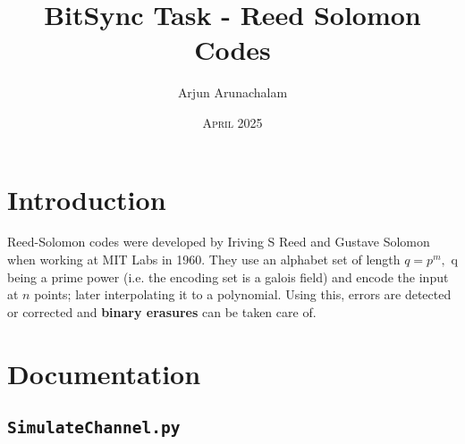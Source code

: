\documentclass{scrartcl}
\title{BitSync Task - Reed Solomon Codes}
\author{Arjun Arunachalam}
\date{\textsc{April 2025}}
\begin{document}
\maketitle

\section{Introduction}
Reed-Solomon codes were developed by Iriving S Reed and Gustave Solomon when working at MIT Labs in 1960. They use an alphabet set of length $q = p^m,$ q being a prime power (i.e. the encoding set is a galois field) and encode the input at $n$ points; later interpolating it to a polynomial. Using this, errors are detected or corrected and \textbf{binary erasures} can be taken care of.

\section{Documentation}

\subsection{\texttt{SimulateChannel.py}}
\end{document}

